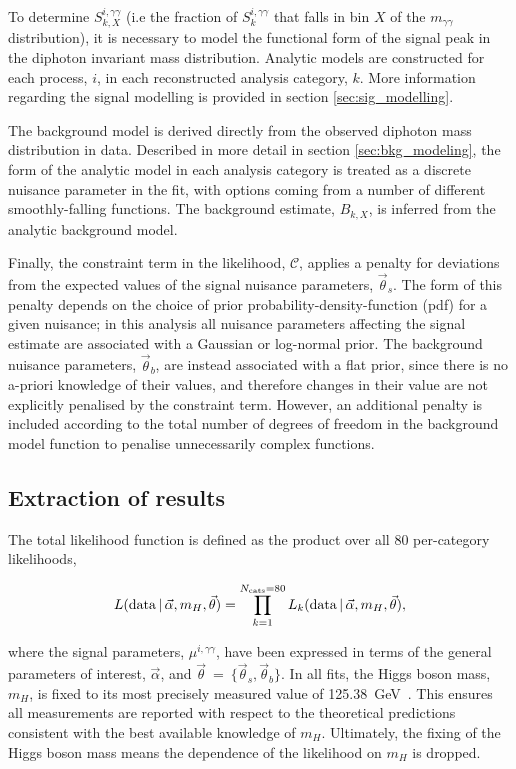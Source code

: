 To determine $S_{k,X}^{i,\gamma\gamma}$ (i.e the fraction of $S_k^{i,\gamma\gamma}$ that falls in bin $X$ of the $m_{\gamma\gamma}$ distribution), it is necessary to model the functional form of the signal peak in the diphoton invariant mass distribution. Analytic models are constructed for each process, $i$, in each reconstructed analysis category, $k$. More information regarding the signal modelling is provided in section \ref{sec:sig_modelling}.

The background model is derived directly from the observed diphoton mass distribution in data. Described in more detail in section \ref{sec:bkg_modeling}, the form of the analytic model in each analysis category is treated as a discrete nuisance parameter in the fit, with options coming from a number of different smoothly-falling functions. The background estimate, $B_{k,X}$, is inferred from the analytic background model.

Finally, the constraint term in the likelihood, $\mathcal{C}$, applies a penalty for deviations from the expected values of the signal nuisance parameters, $\vec{\theta}_s$. The form of this penalty depends on the choice of prior probability-density-function (pdf) for a given nuisance; in this analysis all nuisance parameters affecting the signal estimate are associated with a Gaussian or log-normal prior. The background nuisance parameters, $\vec{\theta}_b$, are instead associated with a flat prior, since there is no a-priori knowledge of their values, and therefore changes in their value are not explicitly penalised by the constraint term. However, an additional penalty is included according to the total number of degrees of freedom in the background model function to penalise unnecessarily complex functions. 

\newpage
\subsection{Extraction of results}\label{sec:results_extraction}
The total likelihood function is defined as the product over all 80 per-category likelihoods,

\begin{equation}
    L({\rm{data}}\,|\,\vec{\alpha},m_H,\vec{\theta}) = \prod_{k=1}^{N_{\rm{cats}}=80}  L_k({\rm{data}}\,|\,\vec{\alpha},m_H,\vec{\theta}),
\end{equation}

\noindent
where the signal parameters, $\mu^{i,\gamma\gamma}$, have been expressed in terms of the general parameters of interest, $\vec{\alpha}$, and $\vec{\theta}$~=~$\{\vec{\theta}_s,\vec{\theta}_b\}$. In all fits, the Higgs boson mass, $m_H$, is fixed to its most precisely measured value of 125.38~GeV~\cite{Sirunyan:2020xwk}. This ensures all measurements are reported with respect to the theoretical predictions consistent with the best available knowledge of $m_H$. Ultimately, the fixing of the Higgs boson mass means the dependence of the likelihood on $m_H$ is dropped.

